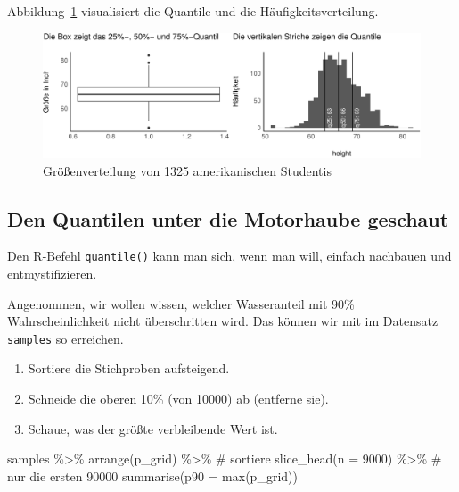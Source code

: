 \documentclass[
  a4paper,
  DIV=11]{scrreprt}
\newenvironment{Shaded}{\begin{snugshade}}{\end{snugshade}}
\newcommand{\AttributeTok}[1]{\textcolor[rgb]{0.40,0.45,0.13}{#1}}
\newcommand{\CommentTok}[1]{\textcolor[rgb]{0.37,0.37,0.37}{#1}}
\newcommand{\DecValTok}[1]{\textcolor[rgb]{0.68,0.00,0.00}{#1}}
\newcommand{\FunctionTok}[1]{\textcolor[rgb]{0.28,0.35,0.67}{#1}}
\newcommand{\NormalTok}[1]{\textcolor[rgb]{0.00,0.23,0.31}{#1}}
\newcommand{\SpecialCharTok}[1]{\textcolor[rgb]{0.37,0.37,0.37}{#1}}
\providecommand{\tightlist}{%
  \setlength{\itemsep}{0pt}\setlength{\parskip}{0pt}}\usepackage{longtable,booktabs,array}
\theoremstyle{definition}
\theoremstyle{remark}
\begin{document}
Abbildung~\ref{fig-stud-height} visualisiert die Quantile und die
Häufigkeitsverteilung.

\begin{figure}

{\centering \includegraphics{./Post_files/figure-pdf/fig-stud-height-1.pdf}

}

\caption{\label{fig-stud-height}Größenverteilung von 1325 amerikanischen
Studentis}

\end{figure}

\hypertarget{den-quantilen-unter-die-motorhaube-geschaut}{%
\subsection{Den Quantilen unter die Motorhaube
geschaut}\label{den-quantilen-unter-die-motorhaube-geschaut}}

Den R-Befehl \texttt{quantile()} kann man sich, wenn man will, einfach
nachbauen und entmystifizieren.

Angenommen, wir wollen wissen, welcher Wasseranteil mit 90\%
Wahrscheinlichkeit nicht überschritten wird. Das können wir mit im
Datensatz \texttt{samples} so erreichen.

\begin{enumerate}
\def\labelenumi{\arabic{enumi}.}
\tightlist
\item
  Sortiere die Stichproben aufsteigend.
\item
  Schneide die oberen 10\% (von 10000) ab (entferne sie).
\item
  Schaue, was der größte verbleibende Wert ist.
\end{enumerate}

\begin{Shaded}
\begin{Highlighting}[]
\NormalTok{samples }\SpecialCharTok{\%\textgreater{}\%} 
  \FunctionTok{arrange}\NormalTok{(p\_grid) }\SpecialCharTok{\%\textgreater{}\%}   \CommentTok{\# sortiere}
  \FunctionTok{slice\_head}\NormalTok{(}\AttributeTok{n =} \DecValTok{9000}\NormalTok{) }\SpecialCharTok{\%\textgreater{}\%}  \CommentTok{\# nur die ersten 90000}
  \FunctionTok{summarise}\NormalTok{(}\AttributeTok{p90 =} \FunctionTok{max}\NormalTok{(p\_grid))}
\end{Highlighting}
\end{Shaded}
\end{document}
